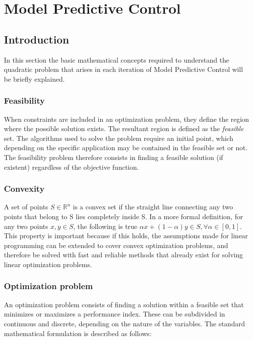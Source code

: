 \chapter{Model Predictive Control}
\label{chap:Model_Predictive_Control}

\section{Introduction}

In this section the basic mathematical concepts required to understand the quadratic problem that arises in each iteration of Model Predictive Control will be briefly explained.

\subsection{Feasibility}

When constraints are included in an optimization problem, they define the region where the possible solution exists. The resultant region is defined as the \emph{feasible} set.  The algorithms used to solve the problem require an initial point,  which depending on the specific application may be contained in the feasible set or not. The feasibility problem therefore consists in finding a feasible solution (if existent) regardless of the objective function.

\subsection{Convexity}

A set of points $S \in \mathbb{R}^{n}$ is a convex set if the straight line connecting any two points that belong to S lies completely inside S. In a more formal definition, for any two points $x,y \in S$, the following is true $\alpha x + (1 - \alpha)y \in S, \forall \alpha \in [0,1]$. \\

This property is important because if this holds, the assumptions made for linear programming can be extended to cover convex optimization problems, and therefore be solved with fast and reliable methods that already exist for solving linear optimization problems.

\subsection{Optimization problem}

An optimization problem consists of finding a solution within a feasible set that minimizes or maximizes a performance index. These can be subdivided in continuous and discrete, depending on the nature of the variables. The standard mathematical formulation is described as follows:

